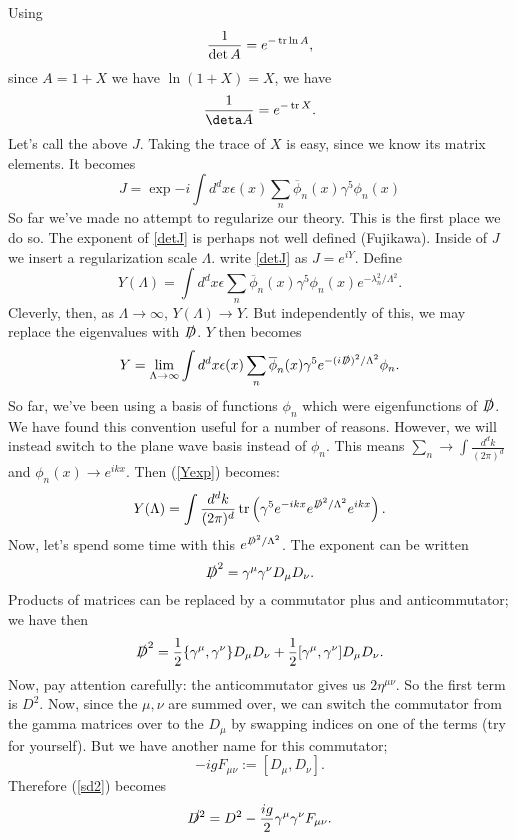 \documentclass[main.tex]{subfiles}
\begin{document}
Using
\[
\frac{1}{\det A} = e^{-\tr \ln A}, 
\]
since $A = 1+X$ we have $\ln (1 + X) = X$, we have
\[
\frac{1}{\deta A} = e^{-\tr X}.
\]
Let's call the above $J$. Taking the trace of $X$ is easy, since we know its matrix elements. It becomes
\begin{equation} \label{detJ}
J = \exp{ 
-i \int d^d x \epsilon (x) \sum_n \overline{\phi}_n (x) \gamma^5 \phi_n (x)
}
\end{equation}
So far we've made no attempt to regularize our theory. This is the first place we do so. The exponent of \ref{detJ} is perhaps not well defined (Fujikawa). Inside of $J$ we insert a regularization scale $\Lambda$. write \ref{detJ} as $J = e^{iY}$. Define
\[
Y(\Lambda) = \int d^d x \epsilon \sum_n \overline{\phi}_n (x) \gamma^5 \phi_n (x) e^{-\lambda^2_n/\Lambda^2}.
\]
Cleverly, then, as $\Lambda \to \infty$, $Y(\Lambda) \to Y$. But independently of this, we may replace the eigenvalues with $\slashed{D}$. $Y$ then becomes
\begin{equation} \label{Yexp}
Y = \lim_{\Lambda \to \infty} \int d^d x \epsilon (x) \sum_n \overline{\phi}_n (x) \gamma^5 e^{-(i\slashed{D})^2/\Lambda^2} \phi_n.
\end{equation}
So far, we've been using a basis of functions $\phi_n$ which were eigenfunctions of $\slashed{D}$. We have found this convention useful for a number of reasons. However, we will instead switch to the plane wave basis instead of $\phi_n$. This means $\sum_n \to \int \frac{d^d k}{(2\pi)^d}$ and $\phi_n (x) \to e^{ikx}$. Then (\ref{Yexp}) becomes:
\[
Y(\Lambda) = \int \frac{d^d k}{(2\pi)^d} \tr \left(
\gamma^5 e^{-ikx} e^{\slashed{D}^2/\Lambda^2} e^{ikx} 
\right).
\]
Now, let's spend some time with this $e^{\slashed{D}^2/\Lambda^2}$. The exponent can be written
\[
\slashed{D}^2 = \gamma^\mu \gamma^\nu D_\mu D_\nu.
\]
Products of matrices can be replaced by a commutator plus and anticommutator; we have then
\begin{equation} \label{sd2}
\slashed{D}^2 = \frac{1}{2} \{ \gamma^{\mu},\gamma^\nu \} D_\mu D_\nu + \frac{1}{2} [\gamma^\mu,\gamma^\nu] D_\mu D_\nu.
\end{equation}
Now, pay attention carefully: the anticommutator gives us $2\eta^{\mu \nu}$. So the first term is $D^2$. Now, since the $\mu,\nu$ are summed over, we can switch the commutator from the gamma matrices over to the $D_\mu$ by swapping indices on one of the terms (try for yourself). But we have another name for this commutator;
\[
-ig F_{\mu \nu} := [D_\mu,D_\nu].
\]
Therefore (\ref{sd2}) becomes
\[
\slashed{D^2} = D^2 - \frac{ig}{2} \gamma^\mu \gamma^\nu F_{\mu \nu}.
\]
\end{document}
